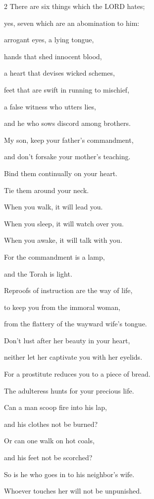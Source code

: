 \begin{multicols}{2}
\vspace{\baselineskip} 
\myverse{}There are six things which the LORD hates;

yes, seven which are an abomination to him:


\myverse{}arrogant eyes, a lying tongue,

hands that shed innocent blood,


\myverse{}a heart that devises wicked schemes,

feet that are swift in running to mischief,


\myverse{}a false witness who utters lies,

and he who sows discord among brothers.


\vspace{\baselineskip} 
\myverse{}My son, keep your father’s commandment,

and don’t forsake your mother’s teaching.


\myverse{}Bind them continually on your heart.

Tie them around your neck.


\myverse{}When you walk, it will lead you.

When you sleep, it will watch over you.

When you awake, it will talk with you.


\myverse{}For the commandment is a lamp,

and the Torah is light.

Reproofs of instruction are the way of life,


\myverse{}to keep you from the immoral woman,

from the flattery of the wayward wife’s tongue.


\myverse{}Don’t lust after her beauty in your heart,

neither let her captivate you with her eyelids.


\myverse{}For a prostitute reduces you to a piece of bread.

The adulteress hunts for your precious life.


\myverse{}Can a man scoop fire into his lap,

and his clothes not be burned?


\myverse{}Or can one walk on hot coals,

and his feet not be scorched?


\myverse{}So is he who goes in to his neighbor’s wife.

Whoever touches her will not be unpunished.



\end{multicols}
